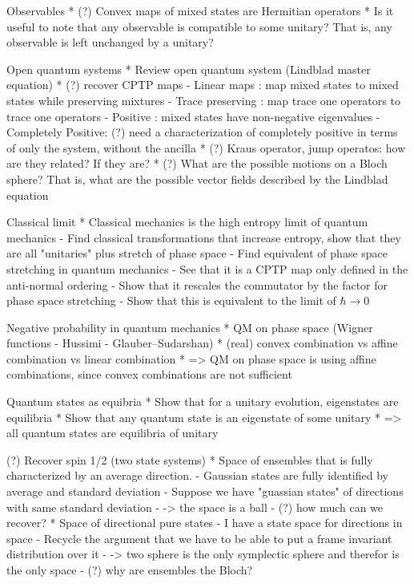 Observables
* (?) Convex maps of mixed states are Hermitian operators
* Is it useful to note that any observable is compatible to some unitary? That is, any observable is left unchanged by a unitary?

Open quantum systems
* Review open quantum system (Lindblad master equation)
* (?) recover CPTP maps 
- Linear maps : map mixed states to mixed states while preserving mixtures
- Trace preserving : map trace one operators to trace one operators
- Positive : mixed states have non-negative eigenvalues
- Completely Positive: (?) need a characterization of completely positive in terms of only the system, without the ancilla
* (?) Kraus operator, jump operatos: how are they related? If they are?
* (?) What are the possible motions on a Bloch sphere? That is, what are the possible vector fields described by the Lindblad equation

Classical limit
* Classical mechanics is the high entropy limit of quantum mechanics
- Find classical transformations that increase entropy, show that they are all "unitaries" plus stretch of phase space
- Find equivalent of phase space stretching in quantum mechanics
- See that it is a CPTP map only defined in the anti-normal ordering
- Show that it rescales the commutator by the factor for phase space stretching
- Show that this is equivalent to the limit of $\hbar \to 0$

Negative probability in quantum mechanics
* QM on phase space (Wigner functions - Hussimi - Glauber–Sudarshan)
* (real) convex combination vs affine combination vs linear combination
* => QM on phase space is using affine combinations, since convex combinations are not sufficient

Quantum states as equibria
* Show that for a unitary evolution, eigenstates are equilibria
* Show that any quantum state is an eigenstate of some unitary
* => all quantum states are equilibria of unitary

(?) Recover spin 1/2 (two state systems)
* Space of ensembles that is fully characterized by an average direction.
  - Gaussian states are fully identified by average and standard deviation
  - Suppose we have "guassian states" of directions with same standard deviation
  - -> the space is a ball
  - (?) how much can we recover?
* Space of directional pure states
  - I have a state space for directions in space
  - Recycle the argument that we have to be able to put a frame invariant distribution over it
  - -> two sphere is the only symplectic sphere and therefor is the only space
  - (?) why are ensembles the Bloch?
  
